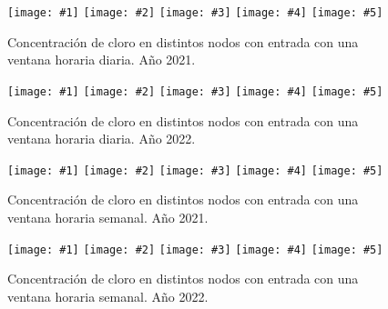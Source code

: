 \documentclass[a4paper]{article}
\newcommand{\FIGV}[7]
{
	\begin{figure}[ht!]
		\centering
		\texttt{[image: \#1]}
		\texttt{[image: \#2]}
		\texttt{[image: \#3]}
		\texttt{[image: \#4]}
		\texttt{[image: \#5]}
		\caption{#6.\label{#7}}
	\end{figure}
}
\begin{document}
\FIGV{2021-chlorine-day-0.eps}{2021-chlorine-day-2.eps}
{2021-chlorine-day-65.eps}{2021-chlorine-day-6665.eps}
{2021-chlorine-day-172.eps}
{Concentración de cloro en distintos nodos con entrada con una ventana horaria
diaria. Año 2021}{Fig2021ChlorineDay}

\FIGV{2022-chlorine-day-0.eps}{2022-chlorine-day-2.eps}
{2022-chlorine-day-6634.eps}{2022-chlorine-day-68.eps}
{2022-chlorine-day-172.eps}
{Concentración de cloro en distintos nodos con entrada con una ventana horaria
diaria. Año 2022}{Fig2022ChlorineDay}

\FIGV{2021-chlorine-week-0.eps}{2021-chlorine-week-2.eps}
{2021-chlorine-week-68.eps}{2021-chlorine-week-123.eps}
{2021-chlorine-week-172.eps}
{Concentración de cloro en distintos nodos con entrada con una ventana horaria
semanal. Año 2021}{Fig2021ChlorineWeek}

\FIGV{2022-chlorine-week-0.eps}{2022-chlorine-week-2.eps}
{2022-chlorine-week-6634.eps}{2022-chlorine-week-139.eps}
{2022-chlorine-week-172.eps}
{Concentración de cloro en distintos nodos con entrada con una ventana horaria
semanal. Año 2022}{Fig2022ChlorineWeek}
\end{document}
